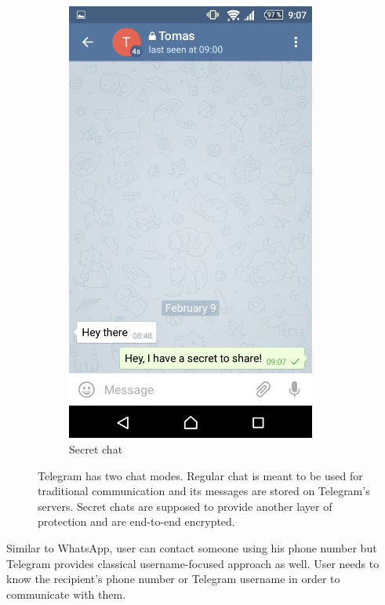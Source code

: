 \documentclass[thesis=M,english]{FITthesis}[2012/10/20]
\begin{document}
\begin{figure}[htb]
\begin{subfigure}[b]{0.4\textwidth}
		\includegraphics[width=0.9\textwidth]{telegram-secret.png}
		\caption{Secret chat}
		\label{img:telegram:secret}
	\end{subfigure}
	\caption[Telegram chat modes]{Telegram has two chat modes. Regular chat is meant to be used for traditional communication and its messages are stored on Telegram's servers. Secret chats are supposed to provide another layer of protection and are end-to-end encrypted.}
\end{figure}

Similar to WhatsApp, user can contact someone using his phone number but Telegram provides classical username-focused approach as well. User needs to know the recipient's phone number or Telegram username in order to communicate with them.
\end{document}
